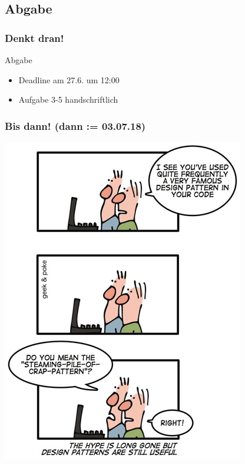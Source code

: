 \documentclass[18pt]{beamer}
\begin{document}
	\subsection{Abgabe}
	\begin{frame}
		\frametitle{Denkt dran!}
		\begin{alertblock}{Abgabe}
			\begin{itemize}
				\item Deadline am 27.6. um 12:00
				\item Aufgabe 3-5 handschriftlich
			\end{itemize}
		\end{alertblock}
	\end{frame}
		
	\begin{frame}
		\frametitle{Bis dann! (dann  := 03.07.18)}
		\centering
		\includegraphics[scale=0.4]{./comics/patterns.jpg}
	\end{frame}
\end{document}
